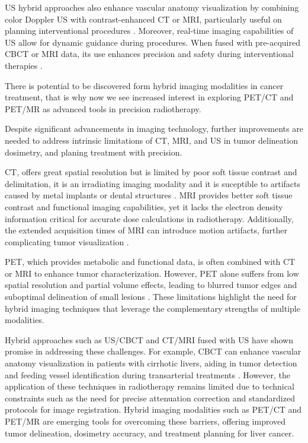 US hybrid approaches also enhance vascular anatomy visualization by combining color Doppler US with contrast-enhanced CT or MRI, particularly useful on planning interventional procedures \cite{frontiers2022}. Moreover, real-time imaging capabilities of US allow for dynamic guidance during procedures. When fused with pre-acquired CBCT or MRI data, its use enhances precision and safety during interventional therapies \cite{rsna2021}.

There is potential to be discovered form hybrid imaging modalities in cancer treatment, that is why now we see increased interest in exploring PET/CT and PET/MR as advanced tools in precision radiotherapy.

Despite significant advancements in imaging technology, further improvements are needed to address intrinsic limitations of CT, MRI, and US in tumor delineation dosimetry, and planing treatment with precision.

CT, offers great spatial resolution but is limited by poor soft tissue contrast and delimitation, it is an irradiating imaging modality and it is suceptible to artifacts caused by metal implants or dental structures \cite{decazes2021}. MRI provides better soft tissue contrast and functional imaging capabilities, yet it lacks the electron density information critical for accurate dose calculations in radiotherapy. Additionally, the extended acquisition times of MRI can introduce motion artifacts, further complicating tumor visualization \cite{floridi2022}.

PET, which provides metabolic and functional data, is often combined with CT or MRI to enhance tumor characterization. However, PET alone suffers from low spatial resolution and partial volume effects, leading to blurred tumor edges and suboptimal delineation of small lesions \cite{yan2024}. These limitations highlight the need for hybrid imaging techniques that leverage the complementary strengths of multiple modalities.

Hybrid approaches such as US/CBCT and CT/MRI fused with US have shown promise in addressing these challenges. For example, CBCT can enhance vascular anatomy visualization in patients with cirrhotic livers, aiding in tumor detection and feeding vessel identification during transarterial treatments \cite{floridi2022}. However, the application of these techniques in radiotherapy remains limited due to technical constraints such as the need for precise attenuation correction and standardized protocols for image registration. Hybrid imaging modalities such as PET/CT and PET/MR are emerging tools for overcoming these barriers, offering improved tumor delineation, dosimetry accuracy, and treatment planning for liver cancer. \cite{knesaurek2018,zhou2021}
